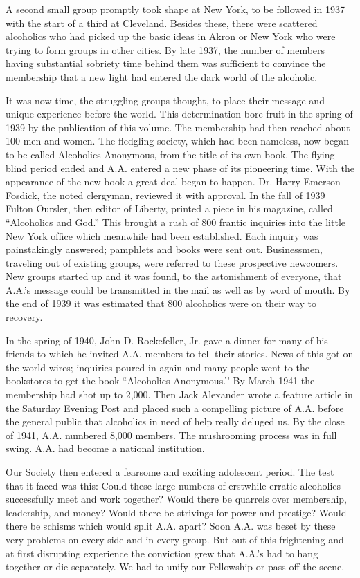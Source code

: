 A second small group promptly took shape at New York, to be followed in 1937 with the start of a third at Cleveland. 
Besides these, there were scattered alcoholics who had picked up the basic ideas in Akron or New York who were trying to form groups in other cities. 
By late 1937, the number of members having substantial sobriety time behind them was sufficient to convince the membership that a new light had entered the dark world of the alcoholic.

It was now time, the struggling groups thought, to place their message and unique experience before the
world. 
This determination bore fruit in the spring of 1939 by the publication of this volume. 
The membership had then reached about 100 men and women. 
The fledgling society, which had been nameless, now began to be called Alcoholics Anonymous, from the title of its own book. 
The flying-blind period ended and A.A. entered a new phase of its pioneering time.
With the appearance of the new book a great deal began to happen. Dr. Harry Emerson Fosdick, the
noted clergyman, reviewed it with approval. 
In the fall of 1939 Fulton Oursler, then editor of Liberty, printed a piece in his magazine, called “Alcoholics and God.” 
This brought a rush of 800 frantic inquiries into the little New York ofﬁce which meanwhile had
been established. 
Each inquiry was painstakingly answered; 
pamphlets and books were sent out. 
Businessmen, traveling out of existing groups, were referred to these prospective newcomers. 
New groups started up and it was found, to the astonishment of everyone, that A.A.’s message could be transmitted in the mail as well as by word of mouth. 
By the end of 1939 it was estimated that 800 alcoholics were on their way to recovery.

In the spring of 1940, John D. Rockefeller, Jr. gave a dinner for many of his friends to which he invited A.A. members to tell their stories. 
News of this got on the world wires; 
inquiries poured in again and many people went to the bookstores to get the book “Alcoholics Anonymous.’’ 
By March 1941 the membership had shot up to 2,000. 
Then Jack Alexander wrote a feature article in the Saturday Evening Post and placed such a compelling picture of A.A. before the general public that alcoholics in need of help really deluged us. 
By the close of 1941, A.A. numbered 8,000 members. 
The mushrooming process was in full swing.
A.A. had become a national institution.

Our Society then entered a fearsome and exciting adolescent period. 
The test that it faced was this:
Could these large numbers of erstwhile erratic alcoholics successfully meet and work together? 
Would there be quarrels over membership, leadership, and money? 
Would there be strivings for power and
prestige? 
Would there be schisms which would split A.A. apart? 
Soon A.A. was beset by these very problems on every side and in every group. 
But out of this frightening and at first disrupting experience the conviction grew that A.A.’s had to hang together or die separately. 
We had to unify our Fellowship or pass off the scene.

